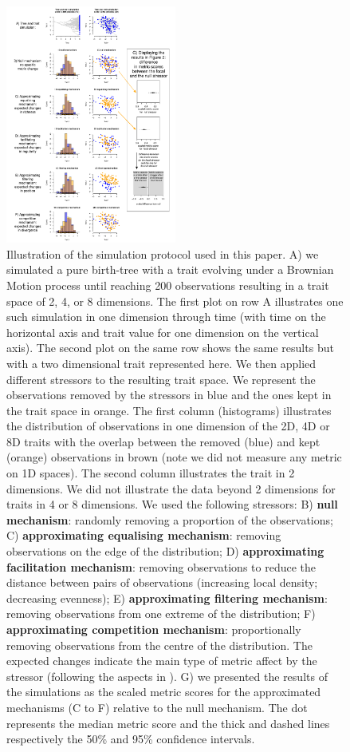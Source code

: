 \documentclass[12pt,letterpaper]{article}
\begin{document}
\begin{figure}[!htbp]
\centering
   \includegraphics[width=0.5\textwidth]{Figures/simulation_protocol_explained.pdf}
\caption{\scriptsize{Illustration of the simulation protocol used in this paper.
A) we simulated a pure birth-tree with a trait evolving under a Brownian Motion process until reaching 200 observations resulting in a trait space of 2, 4, or 8 dimensions.
The first plot on row A illustrates one such simulation in one dimension through time (with time on the horizontal axis and trait value for one dimension on the vertical axis).
The second plot on the same row shows the same results but with a two dimensional trait represented here.
We then applied different stressors to the resulting trait space.
We represent the observations removed by the stressors in blue and the ones kept in the trait space in orange.
The first column (histograms) illustrates the distribution of observations in one dimension of the 2D, 4D or 8D traits with the overlap between the removed (blue) and kept (orange) observations in brown (note we did not measure any metric on 1D spaces).
The second column illustrates the trait in 2 dimensions.
We did not illustrate the data beyond 2 dimensions for traits in 4 or 8 dimensions.
We used the following stressors:
B) \textbf{null mechanism}: randomly removing a proportion of the observations;
C) \textbf{approximating equalising mechanism}: removing observations on the edge of the distribution;
D) \textbf{approximating facilitation mechanism}: removing observations to reduce the distance between pairs of observations (increasing local density; decreasing evenness);
E) \textbf{approximating filtering mechanism}: removing observations from one extreme of the distribution;
F) \textbf{approximating competition mechanism}: proportionally removing observations from the centre of the distribution.
The expected changes indicate the main type of metric affect by the stressor (following the aspects in \citealt{mammola2021concepts}).
G) we presented the results of the simulations as the scaled metric scores for the approximated mechanisms (C to F) relative to the null mechanism. The dot represents the median metric score and the thick and dashed lines respectively the 50\% and 95\% confidence intervals.}}
\label{Fig:simulations}
\end{figure}
\bigskip
\end{document}
